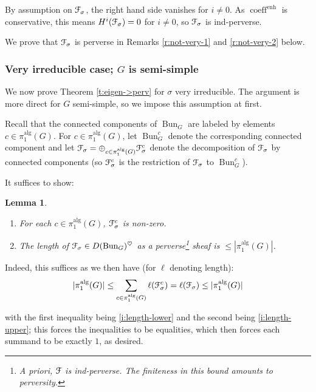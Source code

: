 \documentclass[reqno,11pt]{amsart}
\numberwithin{equation}{subsection}
\newtheorem{lem}[thm]{Lemma}
\theoremstyle{remark}
\newcommand{\sF}{{\EuScript F}}
\newcommand{\on}{\operatorname}
\newcommand{\Bun}{\on{Bun}}
\newcommand{\heart}{\heartsuit}
\newcommand{\coeff}{\on{coeff}}
\newcommand{\enh}{\on{enh}}
\begin{document}
\noindent By assumption on $\sF_{\sigma}$, the right hand side vanishes for 
$i \neq 0$. As $\coeff^{\enh}$ is conservative, this means
$H^i(\sF_{\sigma}) = 0$ for $i \neq 0$, so $\sF_{\sigma}$ is ind-perverse.

We prove that $\sF_{\sigma}$ is perverse in Remarks \ref{r:not-very-1}
and \ref{r:not-very-2} below.

\subsubsection{Very irreducible case; $G$ is semi-simple}\label{sss:ss}

We now prove Theorem \ref{t:eigen->perv} for $\sigma$ very irreducible. 
The argument is more direct for $G$ semi-simple, so we impose this assumption
at first. 

Recall that the connected components of $\Bun_G$ are labeled by 
elements $c \in \pi_1^{\on{alg}}(G)$. For $c \in \pi_1^{\on{alg}}(G)$,
let $\Bun_G^c$ denote the corresponding connected component and let
$\sF_{\sigma} = \oplus_{c \in \pi_1^{\on{alg}}(G)} \sF_{\sigma}^c$ denote
the decomposition of $\sF_{\sigma}$ by connected components 
(so $\sF_{\sigma}^c$ is the restriction of $\sF_{\sigma}$ to 
$\Bun_G^c$). 

It suffices to show:

\begin{lem}\label{l:length}

\begin{enumerate}

\item\label{i:length-lower} For each $c \in \pi_1^{\on{alg}}(G)$, 
$\sF_{\sigma}^c$ is non-zero.

\item\label{i:length-upper} The length of $\sF_{\sigma} \in D(\Bun_G)^{\heart}$ 
as a perverse\footnote{A priori,
$\sF$ is ind-perverse. The finiteness in this bound amounts to perversity.} sheaf
is $\leq |\pi_1^{\on{alg}}(G)|$.

\end{enumerate}

\end{lem}

Indeed, this suffices as we then have (for $\ell$ denoting length):
%
\[
|\pi_1^{\on{alg}}(G)| \leq \sum_{c \in \pi_1^{\on{alg}}(G)} \ell(\sF_{\sigma}^c)
= \ell(\sF_{\sigma}) \leq |\pi_1^{\on{alg}}(G)|
\]

\noindent with the first inequality being \eqref{i:length-lower} and the
second being \eqref{i:length-upper}; this forces the inequalities to be
equalities, which then forces each summand to be exactly $1$, as desired.
\end{document}
